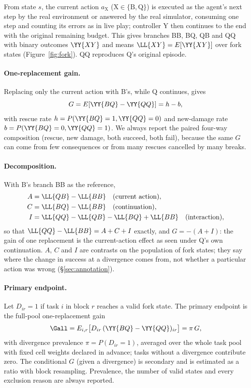From state $s$, the current action $a_{\mathrm{X}}$ ($\mathrm{X}\in\{\mathrm{B},\mathrm{Q}\}$) is executed as the agent's next step by the real environment or answered by the real simulator, consuming one step and counting its errors as in live play; controller $\mathrm{Y}$ then continues to the end with the original remaining budget. This gives branches BB, BQ, QB and QQ with binary outcomes $\YY{XY}$ and means $\LL{XY}=E[\YY{XY}]$ over fork states (Figure~\ref{fig:fork}). QQ reproduces Q's original episode.

\paragraph{One-replacement gain.} Replacing only the current action with B's, while Q continues, gives
\begin{equation}
G = E[\YY{BQ}-\YY{QQ}] = h - b,
\end{equation}
with rescue rate $h=P(\YY{BQ}=1,\YY{QQ}=0)$ and new-damage rate $b=P(\YY{BQ}=0,\YY{QQ}=1)$. We always report the paired four-way composition (rescue, new damage, both succeed, both fail), because the same $G$ can come from few consequences or from many rescues cancelled by many breaks.

\paragraph{Decomposition.} With B's branch BB as the reference,
\begin{align}
A &= \LL{QB}-\LL{BB} \quad\text{(current action)},\\
C &= \LL{BQ}-\LL{BB} \quad\text{(continuation)},\\
I &= \LL{QQ}-\LL{QB}-\LL{BQ}+\LL{BB} \quad\text{(interaction)},
\end{align}
so that $\LL{QQ}-\LL{BB}=A+C+I$ exactly, and $G=-(A+I)$: the gain of one replacement is the current-action effect as seen under Q's own continuation. $A$, $C$ and $I$ are contrasts on the population of fork states; they say where the change in success at a divergence comes from, not whether a particular action was wrong (\S\ref{sec:annotation}).

\paragraph{Primary endpoint.} Let $D_{ir}=1$ if task $i$ in block $r$ reaches a valid fork state. The primary endpoint is the full-pool one-replacement gain
\begin{equation}
\Gall = E_{i,r}\big[D_{ir}\,(\YY{BQ}-\YY{QQ})_{ir}\big] = \pi\, G,
\end{equation}
with divergence prevalence $\pi=P(D_{ir}=1)$, averaged over the whole task pool with fixed cell weights declared in advance; tasks without a divergence contribute zero. The conditional $G$ (given a divergence) is secondary and is estimated as a ratio with block resampling. Prevalence, the number of valid states and every exclusion reason are always reported.

